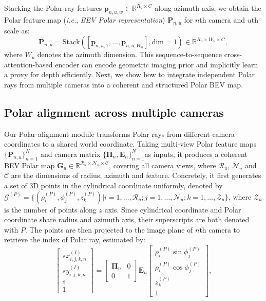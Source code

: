 \documentclass[letterpaper]{article} \usepackage{aaai23}  \usepackage{times}  \usepackage{helvet}  \usepackage{courier}  \usepackage[hyphens]{url}  \usepackage{graphicx} \urlstyle{rm} \def\UrlFont{\rm}  \usepackage{natbib}  \usepackage{caption} \frenchspacing  \setlength{\pdfpagewidth}{8.5in} \setlength{\pdfpageheight}{11in} \usepackage{algorithm}
\def\ie{\textit{i.e.}}
\begin{document}
Stacking the Polar ray features $\mathbf{p}_{n,u,w} \in \mathbb{R}^{R_u \times C}$ along azimuth axis, we obtain the Polar feature map (\ie, {\em BEV Polar representation}) $\mathbf{P}_{n,u}$ for $n$th camera and $u$th scale as:
\begin{equation}
    \mathbf{P}_{n,u}\!=\!\mathrm{Stack}([\mathbf{p}_{n,u,1}, \dots,\mathbf{p}_{n,u,W_u}], \mathrm{dim}\!=\!1) \!\in\! \mathbb{R}^{R_u \!\times\! W_u \!\times\! C },
\end{equation}
where $W_u$ denotes the azimuth dimension.
This sequence-to-sequence cross-attention-based encoder can encode geometric imaging prior and implicitly learn a proxy for depth efficiently. Next, we show how to integrate independent Polar rays from multiple cameras into a coherent and structured Polar BEV map. 

\subsection{Polar alignment across multiple cameras}
Our Polar alignment module transforms Polar rays from different camera coordinates to a shared world coordinate. Taking multi-view Polar feature maps $\{\mathbf{P}_{n,u}\}_{n=1}^N$ and camera matrix $\{\mathbf{\Pi}_n,\mathbf{E}_n\}_{n=1}^N$as inputs, it produces a coherent BEV Polar map $\mathbf{G}_u \in \mathbb{R}^{\mathcal{R}_u\times\mathcal{N}_u\times \mathcal{C}}$, covering all camera views, where $\mathcal{R}_u$, $\mathcal{N}_u$ and $\mathcal{C}$ are the dimensions of radius, azimuth and feature. 
Concretely, it first generates a set of 3D points in the cylindrical coordinate uniformly, denoted by $\mathcal{G}^{(P)}=\{(\rho^{(P)}_{i},\phi^{(P)}_{j},z^{(P)}_{k})|i=1,\dots,\mathcal{R}_u;j=1,\dots,\mathcal{N}_u; k=1,\dots,\mathcal{Z}_u\}$, where $\mathcal{Z}_u$ is the number of points along $z$ axis. Since cylindrical coordinate and Polar coordinate share radius and azimuth axis, their superscripts are both denoted with $P$. The points are then projected to the image plane of $n$th camera to retrieve the index of Polar ray, estimated by:
\begin{equation}\label{eq:alignment_proj}
    \begin{bmatrix}
    sx^{(I)}_{i,j,k,n} \\[5pt]
    sy^{(I)}_{i,j,k,n}\\[5pt]
    s \\[5pt]
    1
    \end{bmatrix} =
    \begin{bmatrix}
    \mathbf{\Pi}_n & 0 \\
    0 & 1
    \end{bmatrix}
    \mathbf{E}_n
    \begin{bmatrix}
    \rho^{(P)}_i\sin{\phi^{(P)}_j} \\[5pt]
    \rho^{(P)}_i\cos{\phi^{(P)}_j} \\[5pt]
    z^{(P)}_k \\[5pt]
    1
    \end{bmatrix},
\end{equation}
\end{document}
